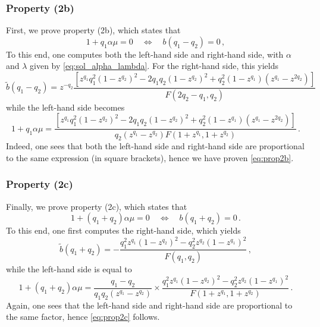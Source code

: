 \documentclass[11pt,a4paper]{article}
\numberwithin{equation}{section}
\numberwithin{table}{section}\setlength{\multlinegap}{25pt}
\begin{document}
\subsubsection*{Property (2b)}
First, we prove property (2b), which states that
\begin{equation}\label{eq:prop2b}
	1+q_1\alpha\mu = 0\quad\iff\quad b(q_1-q_2)=0\,,
\end{equation}
To this end, one computes both the left-hand side and right-hand side, with $\alpha$ and $\lambda$ given by \eqref{eq:sol_alpha_lambda}. For the right-hand side, this yields
\begin{equation}
	\tilde{b}(q_1-q_2) = z^{-q_2}\frac{\left[z^{q_1}q_1^2(1-z^{q_2})^2-2q_1 q_2(1-z^{q_2})^2+q_2^2(1-z^{q_1})(z^{q_1}-z^{2q_2})\right]}{F(2q_2-q_1, q_2)}
\end{equation}
while the left-hand side becomes
\begin{equation}
	1+q_1\alpha\mu = \frac{\left[z^{q_1}q_1^2(1-z^{q_2})^2-2q_1 q_2(1-z^{q_2})^2+q_2^2(1-z^{q_1})(z^{q_1}-z^{2q_2}) \right]}{q_2(z^{q_1}-z^{q_2})F(1+z^{q_1}, 1+z^{q_2})}\,.
\end{equation}
Indeed, one sees that both the left-hand side and right-hand side are proportional to the same expression (in square brackets), hence we have proven \eqref{eq:prop2b}.

\subsubsection*{Property (2c)}
Finally, we prove property (2c), which states that
\begin{equation}\label{eq:prop2c}
	1+(q_1+q_2)\alpha\mu = 0\quad\iff\quad b(q_1+q_2)=0\,.
\end{equation}
To this end, one first computes the right-hand side, which yields
\begin{equation}
	\tilde{b}(q_1+q_2) = -\frac{q_1^2z^{q_1}\left(1-z^{q_2}\right)^2-q_2^2z^{q_2}\left(1-z^{q_1}\right)^2}{F(q_1,q_2)}\,,
\end{equation}
while the left-hand side is equal to
\begin{equation}
	1+(q_1+q_2)\alpha\mu = \frac{q_1-q_2}{q_1q_2(z^{q_1}-z^{q_2})}\times \frac{q_1^2z^{q_1}\left(1-z^{q_2}\right)^2-q_2^2z^{q_2}\left(1-z^{q_1}\right)^2}{F(1+z^{q_1},1+z^{q_2})}\,.
\end{equation}
Again, one sees that the left-hand side and right-hand side are proportional to the same factor, hence 
\eqref{eq:prop2c} follows. 
\end{document}
